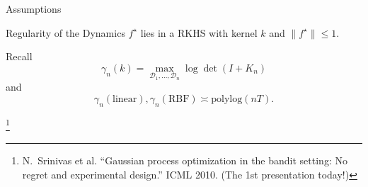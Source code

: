\documentclass[11pt,aspectratio=169,handout]{beamer} %
\newcommand\reffootnote[1]{%
\begingroup
\renewcommand\thefootnote{}\footnote{\hspace{-20px}\color{DarkGray}#1\vspace{5px}}%
\addtocounter{footnote}{-1}%
\endgroup
}
\begin{document}


\begin{frame}{Assumptions}

            

    \begin{block}{Regularity of the Dynamics}
        $f^\star$ lies in a RKHS with kernel $k$ and $\lVert f^\star \rVert \leq 1$.
    \end{block}

    Recall
    \[
        \gamma_n(k) = \max_{\mathcal{D}_1,\ldots,\mathcal{D}_n} \log\det(I + K_n)
    \]
    and
    \[
        \gamma_n(\text{linear}), \gamma_n(\text{RBF}) \asymp \text{polylog}(nT).
    \]

    
    \reffootnote{N.~Srinivas et al. ``Gaussian process optimization in the bandit setting: No regret and experimental design.'' ICML 2010. (The 1st presentation today!)}
\end{frame}
\end{document}
